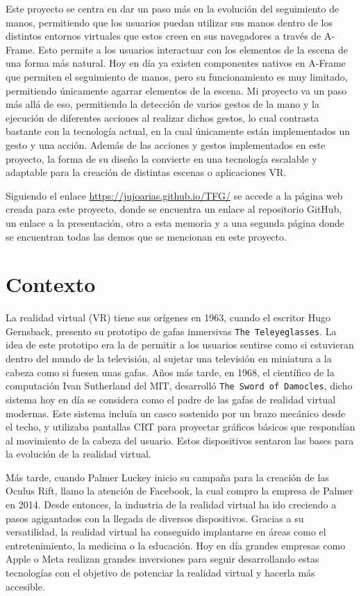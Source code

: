 \documentclass[a4paper, 12pt]{book}
\begin{document}
Este proyecto se centra en dar un paso más en la evolución del seguimiento de manos, permitiendo que los usuarios puedan utilizar sus manos dentro de los distintos entornos virtuales que estos creen en sus navegadores a través de A-Frame. 
Esto permite a los usuarios interactuar con los elementos de la escena de una forma más natural. Hoy en día ya existen componentes nativos en A-Frame que permiten el seguimiento de manos, pero su funcionamiento es muy limitado, permitiendo únicamente agarrar elementos de la escena.
Mi proyecto va un paso más allá de eso, permitiendo la detección de varios gestos de la mano y la ejecución de diferentes acciones al realizar dichos gestos, lo cual contrasta bastante con la tecnología actual, en la cual únicamente están implementados un gesto y una acción.
Además de las acciones y gestos implementados en este proyecto, la forma de su diseño la convierte en una tecnología escalable y adaptable para la creación de distintas escenas o aplicaciones VR. 

Siguiendo el enlace \url{https://jujoarias.github.io/TFG/} se accede a la página web creada para este proyecto, donde se encuentra un enlace al repositorio GitHub, un enlace a la presentación, otro a esta memoria y a una segunda página donde se encuentran todas las demos que se mencionan en este proyecto.
\section{Contexto}
\label{sec:contexto}
La realidad virtual (VR) tiene sus orígenes en 1963, cuando el escritor Hugo Gernsback, presento su prototipo de gafas inmersivas \texttt{The Teleyeglasses}. La idea de este prototipo era la de permitir a los usuarios sentirse como si estuvieran dentro del mundo de la televisión, al sujetar una televisión en miniatura a la cabeza como si fuesen unas gafas. Años más tarde, en 1968, el científico de la computación Ivan Sutherland del MIT,
desarrolló \texttt{The Sword of Damocles}, dicho sistema hoy en día se considera como el padre de las gafas de realidad virtual modernas. Este sistema incluía un casco sostenido por un brazo mecánico desde el techo, y utilizaba pantallas CRT para proyectar gráficos básicos que respondían al movimiento de la cabeza del usuario.
Estos dispositivos sentaron las bases para la evolución de la realidad virtual. 

Más tarde, cuando Palmer Luckey inicio su campaña para la creación de las Oculus Rift, llamo la atención de Facebook, la cual compro la empresa de Palmer en 2014. Desde entonces, la industria de la realidad virtual ha ido creciendo a pasos agigantados con la llegada de diversos dispositivos. Gracias a su versatilidad, la realidad virtual ha conseguido implantarse en áreas como el entretenimiento, la medicina o la educación. Hoy en día grandes empresas como Apple o Meta 
realizan grandes inversiones para seguir desarrollando estas tecnologías con el objetivo de potenciar la realidad virtual y hacerla más accesible.  
\end{document}
